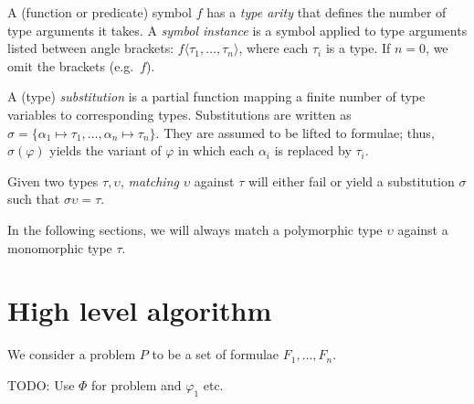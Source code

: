 \documentclass[]{ceurart}
\begin{document}
\begin{definition}%
A (function or predicate) {symbol} \(f\) has a \emph{type arity} that defines the number of type arguments it takes. A \emph{symbol instance} is a symbol applied to type arguments listed between angle brackets: \(f\langle \tau_1, \dots, \tau_n\rangle\), where each $\tau_i$ is a type. If $n = 0$, we omit the brackets (e.g.\ $f$).
\end{definition}

\begin{definition} %
A (type) \emph{substitution} is a partial function mapping a finite number of type variables to corresponding types. Substitutions are written as
$\sigma = \{\alpha_1\mapsto\tau_1, \dots, \alpha_n\mapsto\tau_n\}$. They are assumed to be lifted to formulae; thus, $\sigma(\varphi)$ yields the variant of $\varphi$ in which each $\alpha_i$ is replaced by $\tau_i$.
\end{definition}

\begin{definition}
Given two types \(\tau, \upsilon\), \emph{matching} \(\upsilon\) against \(\tau\) will either fail or yield a substitution \(\sigma\) such that \(\sigma\upsilon = \tau\).
\end{definition}

In the following sections, we will always match a polymorphic type $\upsilon$ against a monomorphic type $\tau$.

%
%

\section{High level algorithm}
\label{sec:high-level-algorithm}

We consider a problem \(P\) to be a set of formulae \(F_1, \dots, F_n\).

TODO: Use $\Phi$ for problem and $\varphi_1$ etc.
\end{document}
